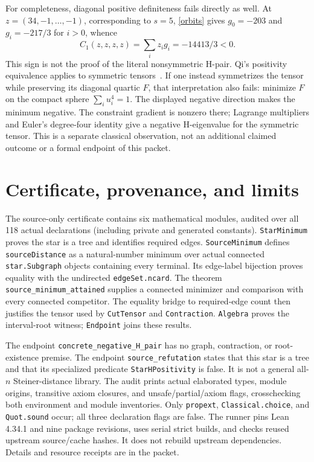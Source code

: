 \documentclass[11pt]{article}
\begin{document}
For completeness, diagonal positive definiteness fails directly as well. At $z=(34,-1,\ldots,-1)$, corresponding to $s=5$, \eqref{orbits} gives $g_0=-203$ and $g_i=-217/3$ for $i>0$, whence
\[
 C_1(z,z,z,z)=\sum_i z_i g_i=-14413/3<0.
\]
This sign is not the proof of the literal nonsymmetric H-pair. Qi's positivity equivalence applies to symmetric tensors~\cite{Qi}. If one instead symmetrizes the tensor while preserving its diagonal quartic $F$, that interpretation also fails: minimize $F$ on the compact sphere $\sum_i u_i^4=1$. The displayed negative direction makes the minimum negative. The constraint gradient is nonzero there; Lagrange multipliers and Euler's degree-four identity give a negative H-eigenvalue for the symmetric tensor. This is a separate classical observation, not an additional claimed outcome or a formal endpoint of this packet.

\section{Certificate, provenance, and limits}
The source-only certificate contains six mathematical modules, audited over all 118 actual declarations (including private and generated constants). \texttt{StarMinimum} proves the star is a tree and identifies required edges. \texttt{SourceMinimum} defines \texttt{sourceDistance} as a natural-number minimum over actual connected \texttt{star.Subgraph} objects containing every terminal. Its edge-label bijection proves equality with the undirected \texttt{edgeSet.ncard}. The theorem \texttt{source\_minimum\_attained} supplies a connected minimizer and comparison with every connected competitor. The equality bridge to required-edge count then justifies the tensor used by \texttt{CutTensor} and \texttt{Contraction}. \texttt{Algebra} proves the interval-root witness; \texttt{Endpoint} joins these results.

The endpoint \texttt{concrete\_negative\_H\_pair} has no graph, contraction, or root-existence premise. The endpoint \texttt{source\_refutation} states that this star is a tree and that its specialized predicate \texttt{StarHPositivity} is false. It is not a general all-$n$ Steiner-distance library. The audit prints actual elaborated types, module origins, transitive axiom closures, and unsafe/partial/axiom flags, crosschecking both environment and module inventories. Only \texttt{propext}, \texttt{Classical.choice}, and \texttt{Quot.sound} occur; all three declaration flags are false. The runner pins Lean 4.34.1 and nine package revisions, uses serial strict builds, and checks reused upstream source/cache hashes. It does not rebuild upstream dependencies. Details and resource receipts are in the packet.
\end{document}
